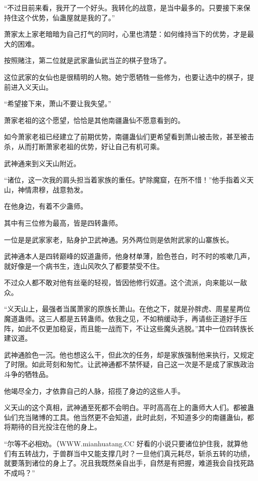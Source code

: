 
\begin{this_body}

“不过目前来看，我开了一个好头。我转化的战意，是当中最多的。只要接下来保持住这个优势，仙蛊屋就是我的了。”

萧家太上家老暗暗为自己打气的同时，心里也清楚：如何维持当下的优势，才是最大的困难。

按照赌注，第二位就是武家蛊仙武当芷的棋子登场了。

这位武家的女仙也是很精明的人物。她宁愿牺牲一些修为，也要让选中的棋子，提前进入义天山。

“希望接下来，萧山不要让我失望。”

萧家老祖的这个愿望，恰恰是其他南疆蛊仙不愿意看到的。

如今萧家老祖已经建立了前期优势，南疆蛊仙们更希望看到萧山被击败，甚至被击杀，从而打断萧家老祖的优势，好让自己有机可乘。

武神通来到义天山附近。

“诸位，这一次我的肩头担当着家族的重任。铲除魔窟，在所不惜！”他手指着义天山，神情肃穆，战意勃发。

在他身边，有着不少蛊师。

其中有三位修为最高，皆是四转蛊师。

一位是是武家家老，贴身护卫武神通。另外两位则是依附武家的山寨族长。

武神通本人是四转巅峰的奴道蛊师，他身材单薄，脸色苍白，时不时的咳嗽几声，就好像是一个病书生，连山风吹久了都要禁受不住。

不过众人都不敢对他有丝毫的轻视，皆因他修行奴道。这个流派，向来能以一敌众。

“义天山上，最强者当属萧家的原族长萧山。在他之下，就是孙胖虎、周星星两位魔道蛊师。这三人都是五转蛊师。依我之见，不如稍缓动手，再请些正道好手压阵，如此不仅更加稳妥，而且能一战而下，不让这些魔头逃脱。”其中一位四转族长建议道。

武神通脸色一沉。他也想这么干，但此次的任务，却是家族强制他来执行，又规定了时限。如此苛刻和匆忙。让武神通都不禁怀疑，自己这一次是不是成了家族政治斗争的牺牲品。

他竭尽全力，才依靠自己的人脉，招揽了身边的这些人手。

义天山的这个真相，武神通至死都不会明白。平时高高在上的蛊师大人们。都被蛊仙们充当赌博的工具。他当然更不会知道，此时此刻，不知道多少的南疆蛊仙，都将期待的目光投注在他的身上。

“尔等不必相劝。（WWW.mianhuatang.CC 好看的小说只要诸位护住我，就算他们有五转战力，于兽群当中又能支撑几时？一旦他们真元耗尽，斩杀五转的功绩，就要落到诸位的身上了。况且我既然亲自出手，自然是有把握，难道我会自找死路不成吗？”


\end{this_body}
